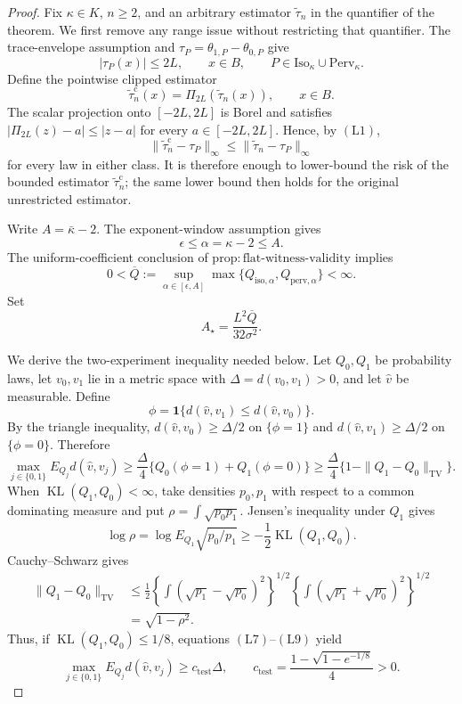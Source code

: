 \documentclass{article}
\begin{document}
\begin{proof}
Fix \(\kappa\in K\), \(n\geq2\), and an arbitrary estimator \(\widetilde\tau_n\) in the quantifier of the theorem.  We first remove any range issue without restricting that quantifier.  The trace-envelope assumption and \(\tau_P=\theta_{1,P}-\theta_{0,P}\) give
\[
 |\tau_P(x)|\leq2L,
 \qquad x\in B,\qquad
 P\in\mathrm{Iso}_\kappa\cup\mathrm{Perv}_\kappa.
 \tag{L1}
\]
Define the pointwise clipped estimator
\[
 \widetilde\tau_n^{\mathrm c}(x)=\Pi_{2L}\!\left(\widetilde\tau_n(x)\right),
 \qquad x\in B.
 \tag{L2}
\]
The scalar projection onto \([-2L,2L]\) is Borel and satisfies
\(|\Pi_{2L}(z)-a|\leq|z-a|\) for every \(a\in[-2L,2L]\).  Hence, by \((\mathrm{L1})\),
\[
 \|\widetilde\tau_n^{\mathrm c}-\tau_P\|_\infty
 \leq\|\widetilde\tau_n-\tau_P\|_\infty
 \tag{L3}
\]
for every law in either class.  It is therefore enough to lower-bound the risk of the bounded estimator \(\widetilde\tau_n^{\mathrm c}\); the same lower bound then holds for the original unrestricted estimator.

Write \(A=\bar\kappa-2\).  The exponent-window assumption gives
\[
 \epsilon\leq\alpha=\kappa-2\leq A.
 \tag{L4}
\]
The uniform-coefficient conclusion of
\(\mathrm{prop{:}flat\text{-}witness\text{-}validity}\) implies
\[
 0<\overline Q:=
 \sup_{\alpha\in[\epsilon,A]}
 \max\{Q_{\mathrm{iso},\alpha},Q_{\mathrm{perv},\alpha}\}<\infty.
 \tag{L5}
\]
Set
\[
 A_\star=\frac{L^2\overline Q}{32\sigma^2}.
 \tag{L6}
\]

We derive the two-experiment inequality needed below.  Let \(Q_0,Q_1\) be probability laws, let \(v_0,v_1\) lie in a metric space with \(\Delta=d(v_0,v_1)>0\), and let \(\widehat v\) be measurable.  Define
\[
 \phi=\mathbf1\{d(\widehat v,v_1)\leq d(\widehat v,v_0)\}.
\]
By the triangle inequality, \(d(\widehat v,v_0)\geq\Delta/2\) on \(\{\phi=1\}\) and \(d(\widehat v,v_1)\geq\Delta/2\) on \(\{\phi=0\}\).  Therefore
\[
 \max_{j\in\{0,1\}}E_{Q_j}d(\widehat v,v_j)
 \geq\frac{\Delta}{4}
 \{Q_0(\phi=1)+Q_1(\phi=0)\}
 \geq\frac{\Delta}{4}\{1-\|Q_1-Q_0\|_{\mathrm{TV}}\}.
 \tag{L7}
\]
When \(\operatorname{KL}(Q_1,Q_0)<\infty\), take densities \(p_0,p_1\) with respect to a common dominating measure and put \(\rho=\int\sqrt{p_0p_1}\).  Jensen's inequality under \(Q_1\) gives
\[
 \log\rho
 =\log E_{Q_1}\sqrt{p_0/p_1}
 \geq-\frac12\operatorname{KL}(Q_1,Q_0).
 \tag{L8}
\]
Cauchy--Schwarz gives
\[
\begin{aligned}
 \|Q_1-Q_0\|_{\mathrm{TV}}
 &\leq\frac12
 \left\{\int(\sqrt{p_1}-\sqrt{p_0})^2\right\}^{1/2}
 \left\{\int(\sqrt{p_1}+\sqrt{p_0})^2\right\}^{1/2}\\
 &=\sqrt{1-\rho^2}.
\end{aligned}
 \tag{L9}
\]
Thus, if \(\operatorname{KL}(Q_1,Q_0)\leq1/8\), equations \((\mathrm{L7})\)--\((\mathrm{L9})\) yield
\[
 \max_{j\in\{0,1\}}E_{Q_j}d(\widehat v,v_j)
 \geq c_{\mathrm{test}}\Delta,
 \qquad
 c_{\mathrm{test}}=
 \frac{1-\sqrt{1-e^{-1/8}}}{4}>0.
 \tag{L10}
\]


\end{proof}
\end{document}
